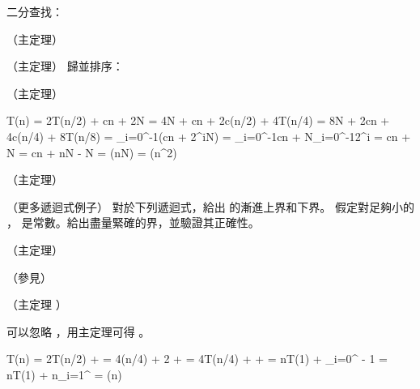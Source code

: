 \startANSWER
二分查找：
\startigBase[n]
\item {} （主定理）
\item {}
\item {} （主定理）
\stopigBase
歸並排序：
\startigBase[n]
\item {} （主定理）
\item
\startformula\startmathalignment
\NC T(n) \NC= 2T(n/2) + cn + 2N = 4N + cn + 2c(n/2) + 4T(n/4) \NR
\NC      \NC= 8N + 2cn + 4c(n/4) + 8T(n/8) \NR
\NC      \NC= \sum_{i=0}^{-1}(cn + 2^iN) \NR
\NC      \NC= \sum_{i=0}^{-1}cn + N\sum_{i=0}^{-1}2^i \NR
\NC      \NC= cn + N \NR
\NC      \NC= cn + nN - N \NR
\NC      \NC= \Theta(nN) \NR
\NC      \NC= \Theta(n^2) \NR
\stopmathalignment\stopformula
\item {} （主定理）
\stopigBase
\stopANSWER
\stopPROBLEM

\startPROBLEM（更多遞迴式例子）
對於下列遞迴式，給出  的漸進上界和下界。
假定對足夠小的 ，  是常數。給出盡量緊確的界，並驗證其正確性。
\startigBase[n]
\item {}

\startANSWER
{} （主定理）
\stopANSWER

\item {}

\startANSWER
{} （參見）
\stopANSWER

\item {}

\startANSWER
{} （主定理 ）
\stopANSWER

\item {}

\startANSWER
可以忽略 ，用主定理可得 。
\stopANSWER

\item[item:Tnlgn] 

\startANSWER
\startformula\startmathalignment
\NC T(n) \NC= 2T(n/2) +  \NR
\NC      \NC= 4(n/4) + 2 +  \NR
\NC      \NC= 4T(n/4) +  +  \NR
\NC      \NC= nT(1) + \sum_{i=0}^{ - 1} \NR
\NC      \NC= nT(1) + n\sum_{i=1}^{} \NR
\NC      \NC= \Theta(n\lg{}) \NR
\stopmathalignment\stopformula
\stopANSWER

